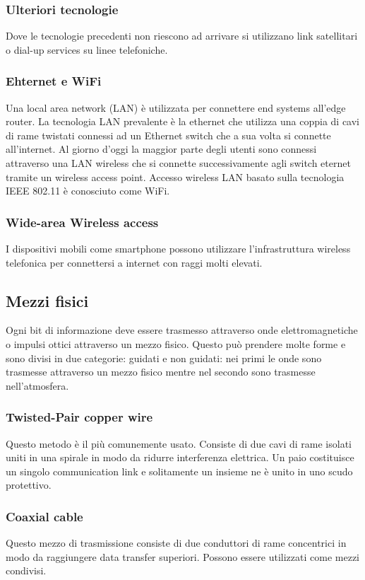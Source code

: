 \subsubsection{Ulteriori tecnologie}
Dove le tecnologie precedenti non riescono ad arrivare si utilizzano link satellitari o dial-up services su linee telefoniche. 
\subsubsection{Ehternet e WiFi}
Una local area network (LAN) \`e utilizzata per connettere end systems all'edge router. La tecnologia LAN prevalente \`e la ethernet che utilizza una coppia di cavi di rame twistati connessi ad un Ethernet switch
che a sua volta si connette all'internet. Al giorno d'oggi la maggior parte degli utenti sono connessi attraverso una LAN wireless che si connette successivamente agli switch eternet tramite un wireless access
point. Accesso wireless LAN basato sulla tecnologia IEEE 802.11 \`e conosciuto come WiFi. 
\subsubsection{Wide-area Wireless access}
I dispositivi mobili come smartphone possono utilizzare l'infrastruttura wireless telefonica per connettersi a internet con raggi molti elevati. 
\subsection{Mezzi fisici}
Ogni bit di informazione deve essere trasmesso attraverso onde elettromagnetiche o impulsi ottici attraverso un mezzo fisico. Questo pu\`o prendere molte forme e sono divisi in due categorie: guidati e non
guidati: nei primi le onde sono trasmesse attraverso un mezzo fisico mentre nel secondo sono trasmesse nell'atmosfera. 
\subsubsection{Twisted-Pair copper wire}
Questo metodo \`e il pi\`u comunemente usato. Consiste di due cavi di rame isolati uniti in una spirale in modo da ridurre interferenza elettrica. Un paio costituisce un singolo communication link e solitamente
un insieme ne \`e unito in uno scudo protettivo. 
\subsubsection{Coaxial cable}
Questo mezzo di trasmissione consiste di due conduttori di rame concentrici in modo da raggiungere data transfer superiori. Possono essere utilizzati come mezzi condivisi. 
